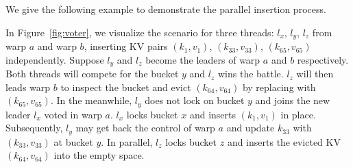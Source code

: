 \vspace{1mm}





We give the following example to demonstrate the parallel insertion process.
\begin{example}
	In Figure~\ref{fig:voter}, we visualize the scenario for three threads: $l_x$, $l_y$, $l_z$ from warp $a$ and warp $b$, inserting KV pairs $(k_1,v_1)$, $(k_{33},v_{33})$, $(k_{65},v_{65})$ independently. 
	Suppose $l_y$ and $l_z$ become the leaders of warp $a$ and $b$ respectively. Both threads will compete for the bucket $y$ and $l_z$ wins the battle. 
	$l_z$ will then leads warp $b$ to inspect the bucket and evict $(k_{64},v_{64})$ by replacing with $(k_{65},v_{65})$. 
	In the meanwhile, $l_y$ does not lock on bucket $y$ and joins the new leader $l_x$ voted in warp $a$. 
	$l_x$ locks bucket $x$ and inserts $(k_1,v_1)$ in place. Subsequently, $l_y$ may get back the control of warp $a$ and update $k_{33}$ with $(k_{33},v_{33})$ at bucket $y$. In parallel, $l_z$ locks bucket $z$ and inserts the evicted KV $(k_{64},v_{64})$ into the empty space. 
\end{example}

